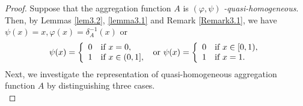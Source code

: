 \documentclass[12pt]{article}
\begin{document}
\begin{proof}
Suppose that the aggregation function $A$ is $(\varphi, \psi)$ \emph{-quasi-homogeneous}. Then, by Lemmas \ref{lem3.2}, \ref{lemma3.1} and Remark \ref{Remark3.1}, we have $\psi(x)=x, \varphi(x)=\delta_{A}^{-1}(x)$ or
$$\psi(x)=\left\{\begin{array}{ll}
0 & {\mbox{\scriptsize\normalsize if } x=0,}\\
1 & {\mbox{\scriptsize\normalsize if } x \in(0, 1],}
\end{array}
\right.
\mbox{ or }
\psi(x)=\left\{\begin{array}{ll}
0 & {\mbox{\scriptsize\normalsize if  } x \in[0, 1),}\\
1 & {\mbox{\scriptsize\normalsize if  } x=1.}
\end{array}
\right.$$
Next, we investigate the representation of quasi-homogeneous aggregation function $A$ by distinguishing three cases.\\


\end{proof}
\end{document}
